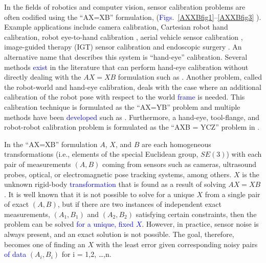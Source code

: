 \documentclass[twocolumn,10pt]{asme2ej}
\begin{document}
In the fields of robotics and computer vision, sensor calibration problems are often codified using the ``AX=XB'' formulation, (\textcolor{blue}{Figs.~\ref{AXXBfig1}--\ref{AXXBfig3}}%
). Example applications include camera calibration, Cartesian robot hand calibration, robot eye-to-hand calibration \cite{tsai1989new}, aerial vehicle sensor calibration \cite{darius1}, image-guided therapy (IGT) sensor calibration and endoscopic surgery \cite{schmidt2003robust}. An alternative name that describes this system is ``hand-eye'' calibration. Several methods \textcolor{blue}{exist} %
in the literature that can perform hand-eye calibration without directly dealing with the $AX=XB$ formulation such as \cite{malm2000new,heller2012branch,ruland2012globally,wu2014hand,kim,liu2015calibration}. %
Another problem, called the robot-world and hand-eye calibration, deals with the case where an additional calibration of the robot pose with respect to the world \textcolor{blue}{frame} is needed. This calibration technique is formulated as the ``AX=YB'' problem and multiple methods have been \textcolor{blue}{developed} %
such as \cite{zhuang1994simultaneous,dornaika1998simultaneous,hirsh2001iterative,li2010simultaneous,ernst2012non,heller2014hand}.
Furthermore, a hand-eye, tool-flange, and robot-robot calibration problem is formulated as the ``AXB = YCZ'' problem in \cite{wang2014towards}.

In the ``AX=XB'' formulation $A$, $X$, and $B$ are each homogeneous transformations (i.e., elements of the special Euclidean group, $SE(3)$) with each pair of measurements $(A,B)$ coming from sensors such as cameras, ultrasound probes, optical, or electromagnetic pose tracking systems, among others. $X$ is the unknown rigid-body \textcolor{blue}{transformation} %
that is found as a result of solving $AX=XB$. It is well known that it is not possible to solve for
a unique $X$ from a single pair of exact $(A,B)$, but if there are two instances of independent exact measurements, $(A_1,B_1)$ and $(A_2,B_2)$ satisfying certain constraints,
then the problem can be solved \textcolor{blue}{for a unique, fixed $X$}. However, in practice, sensor noise is always present, and an exact solution is not possible. The goal, therefore, becomes one of finding
an $X$ with the least error given corresponding noisy pairs \textcolor{blue}{of data} $(A_i, B_i)$ for i = 1,2, \ldots,n.
\end{document}
